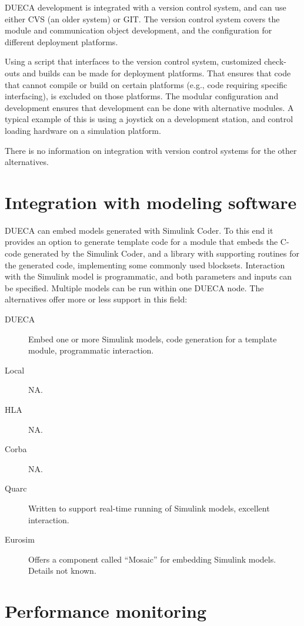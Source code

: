 \documentclass[11pt,a4paper,twoside]{scrreprt}
\begin{document}
DUECA development is integrated with a version control system, and can
use either CVS (an older system) or GIT. The version control system
covers the module and communication object development, and the
configuration for different deployment platforms.

Using a script that interfaces to the version control system, customized check-outs and builds can be made for deployment platforms. That ensures that code that cannot compile or build on certain platforms (e.g., code requiring specific interfacing), is excluded on those platforms. The modular configuration and development ensures that development can be done with alternative modules. A typical example of this is using a joystick on a development station, and control loading hardware on a simulation platform.

There is no information on integration with version control systems for the other alternatives.

\section{Integration with modeling software}

DUECA can embed models generated with Simulink Coder. To this end it provides an option to generate template code for a module that embeds the C-code generated by the Simulink Coder, and a library with supporting routines for the generated code, implementing some commonly used blocksets. Interaction with the Simulink model is programmatic, and both parameters and inputs can be specified. Multiple models can be run within one DUECA node. The alternatives offer more or less support in this field:

\begin{description}
\item[DUECA] Embed one or more Simulink models, code generation for a template module, programmatic interaction.
\item[Local] NA.
\item[HLA] NA.
\item[Corba] NA.
\item[Quarc] Written to support real-time running of Simulink models, excellent interaction.
\item[Eurosim] Offers a component called ``Mosaic'' for embedding Simulink models. Details not known.
\end{description}

\section{Performance monitoring}
\end{document}
